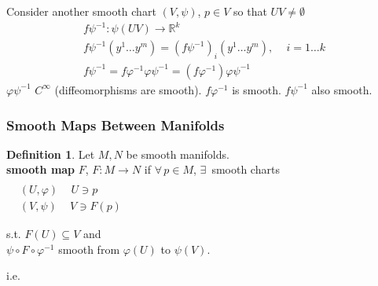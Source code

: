 \documentclass[11pt]{amsart}
\theoremstyle{definition}
\newtheorem{definition}{Definition}
\begin{document}
Consider another smooth chart $(V,\psi)$, $p\in V$ so that $UV \neq \emptyset$
\[
\begin{gathered}
  f\psi^{-1} : \psi(UV) \to \mathbb{R}^k \\
  f\psi^{-1}(y^1 \dots y^m ) = (f\psi^{-1})_i(y^1 \dots y^m) , \quad \, i = 1\dots k \\
  f\psi^{-1} = f\varphi^{-1}\varphi \psi^{-1} = (f\varphi^{-1}) \varphi \psi^{-1}
\end{gathered}
\]
$\varphi \psi^{-1}$ $C^{\infty}$ (diffeomorphisms are smooth).  $f\varphi^{-1}$ is smooth.  $f\psi^{-1}$ also smooth.

\subsubsection*{Smooth Maps Between Manifolds}

\begin{definition}
  Let $M,N$ be smooth manifolds.  \\
  \textbf{smooth map } $F$, $F:M \to N$ if $\forall \, p \in M$, $\exists \, $ smooth charts $\begin{aligned} & \quad \\
    & (U,\varphi) \quad \, U \ni p \\
    & (V,\psi) \quad \, V \ni F(p) \end{aligned}$

s.t. $F(U) \subseteq V$ and \\
\phantom{s.t. } $\psi \circ F \circ \varphi^{-1}$ smooth from $\varphi(U)$ to $\psi(V)$.
\end{definition}

i.e.



\end{document}
